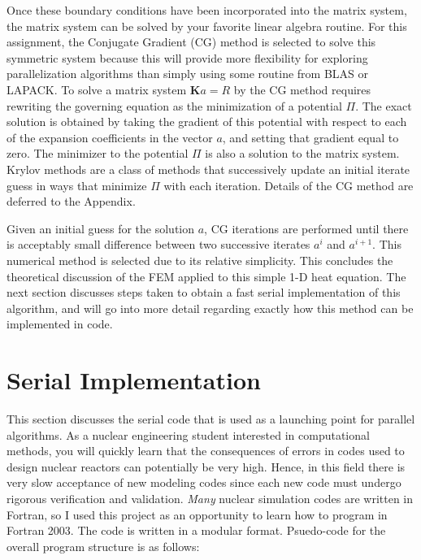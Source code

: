 \documentclass[10pt]{article}
\begin{document}
Once these boundary conditions have been incorporated into the matrix system, the matrix system can be solved by your favorite linear algebra routine. For this assignment, the Conjugate Gradient (CG) method is selected to solve this symmetric system because this will provide more flexibility for exploring parallelization algorithms than simply using some routine from BLAS or LAPACK. To solve a matrix system \(\textbf{K}a=R\) by the CG method requires rewriting the governing equation as the minimization of a potential \(\Pi\). The exact solution is obtained by taking the gradient of this potential with respect to each of the expansion coefficients in the vector \(a\), and setting that gradient equal to zero. The minimizer to the potential \(\Pi\) is also a solution to the matrix system. Krylov methods are a class of methods that successively update an initial iterate guess in ways that minimize \(\Pi\) with each iteration. Details of the CG method are deferred to the Appendix.

Given an initial guess for the solution \(a\), CG iterations are performed until there is acceptably small difference between two successive iterates \(a^i\) and \(a^{i+1}\). This numerical method is selected due to its relative simplicity. This concludes the theoretical discussion of the FEM applied to this simple 1-D heat equation. The next section discusses steps taken to obtain a fast serial implementation of this algorithm, and will go into more detail regarding exactly how this method can be implemented in code.

\section{Serial Implementation}

This section discusses the serial code that is used as a launching point for parallel algorithms. As a nuclear engineering student interested in computational methods, you will quickly learn that the consequences of errors in codes used to design nuclear reactors can potentially be very high. Hence, in this field there is very slow acceptance of new modeling codes since each new code must undergo rigorous verification and validation. {\it Many} nuclear simulation codes are written in Fortran, so I used this project as an opportunity to learn how to program in Fortran 2003. The code is written in a modular format. Psuedo-code for the overall program structure is as follows:
\end{document}
